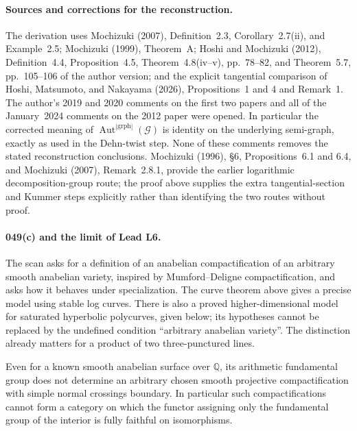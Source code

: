 \paragraph{Sources and corrections for the reconstruction.}
The derivation uses Mochizuki (2007), Definition~2.3,
Corollary~2.7(ii), and Example~2.5; Mochizuki (1999), Theorem~A;
Hoshi and Mochizuki (2012), Definition~4.4, Proposition~4.5,
Theorem~4.8(iv--v), pp.~78--82, and Theorem~5.7, pp.~105--106
of the author version; and the explicit
tangential comparison of Hoshi, Matsumoto, and Nakayama (2026),
Propositions~1 and 4 and Remark~1. The author's 2019 and 2020
comments on the first two papers and all of the January~2024
comments on the 2012 paper were opened. In particular the corrected
meaning of $\operatorname{Aut}^{|\mathrm{grph}|}(\mathcal G)$ is
identity on the underlying semi-graph, exactly as used in the
Dehn-twist step. None of these comments removes the stated
reconstruction conclusions. Mochizuki (1996), \S6, Propositions~6.1
and 6.4, and Mochizuki (2007), Remark~2.8.1, provide the earlier
logarithmic decomposition-group route; the proof above supplies the
extra tangential-section and Kummer steps explicitly rather than
identifying the two routes without proof.

\paragraph{049(c) and the limit of Lead L6.}
The scan asks for a definition of an anabelian compactification of an
arbitrary smooth anabelian variety, inspired by Mumford--Deligne
compactification, and asks how it behaves under specialization.
The curve theorem above gives a precise model using stable log curves.
There is also a proved higher-dimensional model for saturated
hyperbolic polycurves, given below; its hypotheses cannot be replaced
by the undefined condition ``arbitrary anabelian variety''. The
distinction already matters for a product of two three-punctured lines.

\begin{proposition}
\label{A:compactification-obstruction}
Even for a known smooth anabelian surface over $\mathbb Q$, its
arithmetic fundamental group does not determine an arbitrary chosen
smooth projective compactification with simple normal crossings
boundary. In particular such compactifications cannot form a category
on which the functor assigning only the fundamental group of the
interior is fully faithful on isomorphisms.
\end{proposition}

